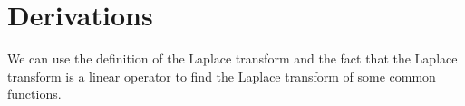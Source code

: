 \section{Derivations}
\noindent
We can use the definition of the Laplace transform and the fact that the Laplace transform is a linear operator to find the Laplace transform of some common functions.









